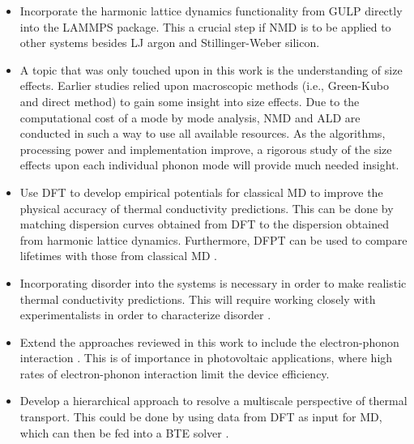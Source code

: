 \begin{itemize}
\item Incorporate the harmonic lattice dynamics functionality from GULP directly into the LAMMPS package. This a crucial step if NMD is to be applied to other systems besides LJ argon and Stillinger-Weber silicon.

\item A topic that was only touched upon in this work is the understanding of size effects. Earlier studies relied upon macroscopic methods (i.e., Green-Kubo and direct method) to gain some insight into size effects. Due to the computational cost of a mode by mode analysis, NMD and ALD are conducted in such a way to use all available resources. As the algorithms, processing power and implementation improve, a rigorous study of the size effects upon each individual phonon mode will provide much needed insight. 

\item Use DFT to develop empirical potentials for classical MD to improve the physical accuracy of thermal conductivity predictions. This can be done by matching dispersion curves obtained from DFT to the dispersion obtained from harmonic lattice dynamics. Furthermore, DFPT can be used to compare lifetimes with those from classical MD \cite{paulatto2013anharmonic}.

\item Incorporating disorder into the systems is necessary in order to make realistic thermal conductivity predictions. This will require working closely with experimentalists in order to characterize disorder \cite{millis2003towards}. 

\item Extend the approaches reviewed in this work to include the electron-phonon interaction \cite{PhysRevB.77.125209}. This is of importance in photovoltaic applications, where high rates of electron-phonon interaction limit the device efficiency.

\item Develop a hierarchical approach to resolve a multiscale perspective of thermal transport. This could be done by using data from DFT as input for MD, which can then be fed into a BTE solver \cite{pinedathesis}.
\end{itemize}

